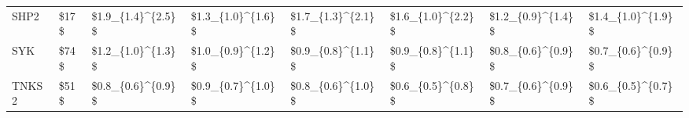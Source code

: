 \begin{tabular}{llllllll}
SHP2   &   \$17\$ &    \$1.9\_\{1.4\}\textasciicircum \{2.5\}\$ &    \$1.3\_\{1.0\}\textasciicircum \{1.6\}\$ &    \$1.7\_\{1.3\}\textasciicircum \{2.1\}\$ &    \$1.6\_\{1.0\}\textasciicircum \{2.2\}\$ &    \$1.2\_\{0.9\}\textasciicircum \{1.4\}\$ &    \$1.4\_\{1.0\}\textasciicircum \{1.9\}\$ \\
SYK    &   \$74\$ &    \$1.2\_\{1.0\}\textasciicircum \{1.3\}\$ &    \$1.0\_\{0.9\}\textasciicircum \{1.2\}\$ &    \$0.9\_\{0.8\}\textasciicircum \{1.1\}\$ &    \$0.9\_\{0.8\}\textasciicircum \{1.1\}\$ &    \$0.8\_\{0.6\}\textasciicircum \{0.9\}\$ &    \$0.7\_\{0.6\}\textasciicircum \{0.9\}\$ \\
TNKS2  &   \$51\$ &    \$0.8\_\{0.6\}\textasciicircum \{0.9\}\$ &    \$0.9\_\{0.7\}\textasciicircum \{1.0\}\$ &    \$0.8\_\{0.6\}\textasciicircum \{1.0\}\$ &    \$0.6\_\{0.5\}\textasciicircum \{0.8\}\$ &    \$0.7\_\{0.6\}\textasciicircum \{0.9\}\$ &    \$0.6\_\{0.5\}\textasciicircum \{0.7\}\$ \\
\bottomrule
\end{tabular}
